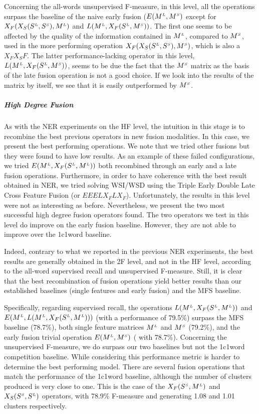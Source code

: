 Concerning the all-words unsupervised F-measure, in this level, all the operations surpass the baseline of the naive early fusion ($E(M^{\scriptscriptstyle L},M^{\scriptscriptstyle S})$ except for  $X_F(X_S(S^{\scriptscriptstyle L},S^{\scriptscriptstyle S}),M^{\scriptscriptstyle L})$ and $L(M^{\scriptscriptstyle L}, X_F(S^{\scriptscriptstyle L},M^{\scriptscriptstyle S}))$. The first one seems to be affected by the quality of the information contained in $M^{\scriptscriptstyle L}$, compared to $M^{\scriptscriptstyle S}$, used in the more performing operation $X_F(X_S(S^{\scriptscriptstyle L}, S^{\scriptscriptstyle S}), M^{\scriptscriptstyle S})$, which is also a $X_FX_SF$.  The latter performance-lacking operator in this level, $L(M^{\scriptscriptstyle L}, X_F(S^{\scriptscriptstyle L},M^{\scriptscriptstyle S}))$, seems to be due the fact that the $M^{\scriptscriptstyle S}$ matrix as the basis of the late fusion operation is not a good choice. If we look into the results of the matrix by itself, we see that it is easily outperformed by $M^{\scriptscriptstyle S}$.




\subparagraph{High Degree Fusion}
As with the NER experiments on the HF level, the intuition in this stage is to recombine the best previous  operators in new fusion modalities. In this case, we present the best performing operations. We note that we tried other fusions but they were found to have low results. As an example of these failed configurations, we tried $E(M^{\scriptscriptstyle L},X_F(S^{\scriptscriptstyle L},M^{\scriptscriptstyle L}))$ both recombined through an early and a late fusion operations. Furthermore, in order to have coherence with the best result obtained in NER, we tried solving WSI/WSD using the Triple Early Double Late Cross Feature Fusion (or $EEELX_FLX_F$). Unfortunately, the results in this level were not as interesting as before. Nevertheless, we present the two most successful high degree fusion operators found. The two operators we test in this level do improve on the early fusion baseline. However, they are not able to improve over the 1c1word baseline. 

Indeed, contrary to what we reported in the previous NER experiments, the best results are generally obtained in the 2F level, and not in the HF level, according to the all-word supervised recall and unsupervised F-measure. Still, it is clear that the best recombination of fusion operations yield better results than our established baselines (single features and early fusion) and the MFS baseline.

Specifically, regarding supervised recall, the operations $L(M^{\scriptscriptstyle L}, X_F(S^{\scriptscriptstyle L},M^{\scriptscriptstyle L}))$ and $E(M^{\scriptscriptstyle L},L(M^{\scriptscriptstyle L},X_F(S^{\scriptscriptstyle L},M^{\scriptscriptstyle L})))$ (with a performance of 79.5\%) surpass the MFS baseline (78.7\%), both single feature matrices $M^{\scriptscriptstyle L}$ and $M^{\scriptscriptstyle S}$ (79.2\%), and the early fusion trivial operation $E(M^{\scriptscriptstyle L},M^{\scriptscriptstyle S})$ ( with 78.7\%). Concerning the unsupervised F-measure, we do surpass our two baselines but not the 1c1word competition baseline. While considering this performance metric is harder to determine the best performing model. There are several fusion operations that match the performance of the 1c1word baseline, although the number of clusters produced is very close to one. This is the case of the $X_F(S^{\scriptscriptstyle S},M^{\scriptscriptstyle L})$ and $X_S(S^{\scriptscriptstyle S},S^{\scriptscriptstyle L})$ operators, with 78.9\% F-measure and generating 1.08 and 1.01 clusters respectively. 

